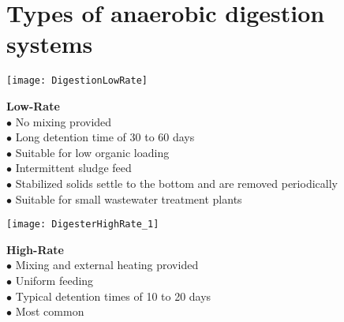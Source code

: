 \section{Types of anaerobic digestion systems}                

\vspace{1cm}
\begin{minipage}{.25\textwidth}
      \texttt{[image: DigestionLowRate]}
    \end{minipage}
\hspace{1cm}
\begin{minipage}{.35\textwidth}
        \end{minipage}
\begin{minipage}{.50\textwidth}\textbf{Low-Rate}\\
$\bullet$ No mixing provided\\
$\bullet$ Long detention time of 30 to 60 days\\
$\bullet$ Suitable for low organic loading\\
$\bullet$ Intermittent sludge feed\\
$\bullet$ Stabilized solids settle to the bottom and are removed periodically\\
$\bullet$ Suitable for small wastewater treatment plants\\ \end{minipage}

\vspace{1cm}

\begin{minipage}{.25\textwidth}

		\texttt{[image: DigesterHighRate\_1]}\\
    \end{minipage}
    \hspace{1cm}
\begin{minipage}{.35\textwidth}
        \end{minipage}
\begin{minipage}{.50\textwidth}\textbf{High-Rate}\\
$\bullet$ Mixing and external heating provided\\
$\bullet$ Uniform feeding\\
$\bullet$ Typical detention times of 10 to 20 days\\
$\bullet$ Most common\\  \end{minipage}

